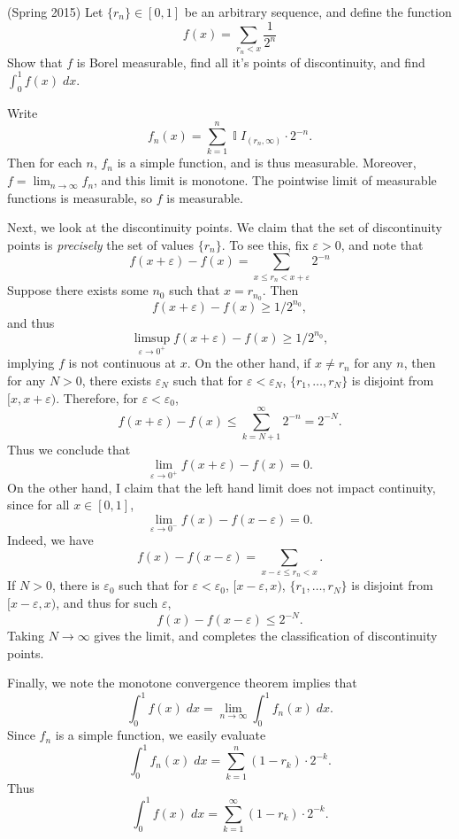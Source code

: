 \documentclass[answers]{exam}
\DeclareMathOperator{\II}{\mathbb{I}}
\begin{document}
\begin{questions}
\question (Spring 2015)
    Let $\{ r_n \} \in [0,1]$ be an arbitrary sequence, and define the function
    \[ f(x) = \sum_{r_n < x} \frac{1}{2^n} \]
    Show that $f$ is Borel measurable, find all it's points of discontinuity, and find $\int_0^1 f(x)\; dx$.
\begin{solution}
    Write
    \[ f_n(x) = \sum_{k = 1}^n \II{I}_{(r_n, \infty)} \cdot 2^{-n}. \]
    Then for each $n$, $f_n$ is a simple function, and is thus measurable. Moreover, $f = \lim_{n \to \infty} f_n$, and this limit is monotone. The pointwise limit of measurable functions is measurable, so $f$ is measurable.
    
    Next, we look at the discontinuity points. We claim that the set of discontinuity points is \emph{precisely} the set of values $\{ r_n \}$. To see this, fix $\varepsilon > 0$, and note that
    \[ f(x + \varepsilon) - f(x) = \sum_{x \leq r_n < x + \varepsilon} 2^{-n} \]
    Suppose there exists some $n_0$ such that $x = r_{n_0}$. Then
    \[ f(x + \varepsilon) - f(x) \geq 1/2^{n_0}, \]
    and thus
    \[ \limsup_{\varepsilon \to 0^+} f(x + \varepsilon) - f(x) \geq 1/2^{n_0}, \]
    implying $f$ is not continuous at $x$. On the other hand, if $x \neq r_n$ for any $n$, then for any $N > 0$, there exists $\varepsilon_N$ such that for $\varepsilon < \varepsilon_N$, $\{ r_1, \dots, r_N \}$ is disjoint from $[x,x+\varepsilon)$. Therefore, for $\varepsilon < \varepsilon_0$,
    \[ f(x + \varepsilon) - f(x) \leq \sum_{k = N+1}^\infty 2^{-n} = 2^{-N}. \]
    Thus we conclude that
    \[ \lim_{\varepsilon \to 0^+} f(x + \varepsilon) - f(x) = 0. \]
    On the other hand, I claim that the left hand limit does not impact continuity, since for all $x \in [0,1]$,
    \[ \lim_{\varepsilon \to 0^-} f(x) - f(x-\varepsilon) = 0. \]
    Indeed, we have
    \[ f(x) - f(x-\varepsilon) = \sum_{x - \varepsilon \leq r_n < x}. \]
    If $N > 0$, there is $\varepsilon_0$ such that for $\varepsilon < \varepsilon_0$, $[x-\varepsilon,x)$, $\{ r_1, \dots, r_N \}$ is disjoint from $[x-\varepsilon,x)$, and thus for such $\varepsilon$,
    \[ f(x) - f(x-\varepsilon) \leq 2^{-N}. \]
    Taking $N \to \infty$ gives the limit, and completes the classification of discontinuity points.
    
    Finally, we note the monotone convergence theorem implies that
    \[ \int_0^1 f(x)\; dx = \lim_{n \to \infty} \int_0^1 f_n(x)\; dx. \]
    Since $f_n$ is a simple function, we easily evaluate
    \[ \int_0^1 f_n(x)\; dx = \sum_{k = 1}^n (1 - r_k) \cdot 2^{-k}. \]
    Thus
    \[ \int_0^1 f(x)\; dx = \sum_{k = 1}^\infty (1 - r_k) \cdot 2^{-k}. \]
\end{solution}



\end{questions}
\end{document}
